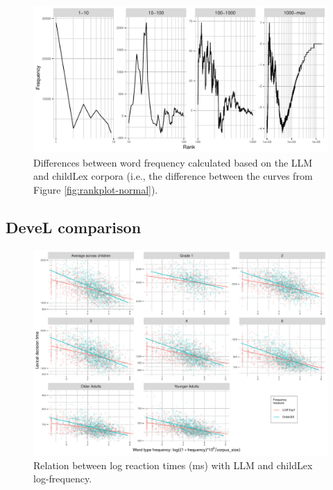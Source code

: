 \documentclass[doc, a4paper, anonymous]{apa7}
\begin{document}
\begin{figure}[!htbp]
    \includegraphics[width = 0.8\paperwidth]{figures/rankplot-difs-3.5-2.pdf}
    \caption{Differences between word frequency calculated based on the LLM and childLex corpora (i.e., the difference between the curves from Figure \ref{fig:rankplot-normal}).}
    \label{fig:rankplot-difs}
\end{figure}

\clearpage

\subsection{DeveL comparison}

\begin{figure}[!htbp]
    \centering
    \includegraphics[width = 0.8\paperwidth]{figures/exp18plus1-log.pdf}
    \caption{Relation between log reaction times (ms) with LLM and childLex log-frequency.}
\label{fig:rt-f-scatter}
\end{figure}
\end{document}

